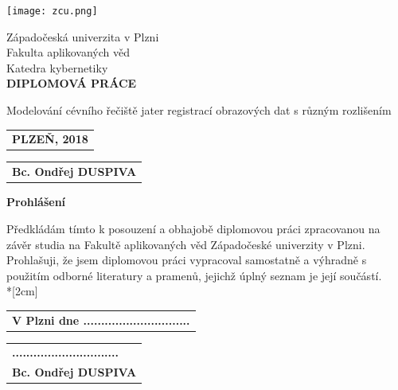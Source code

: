 \documentclass{thesis}%
\begin{document}
%
\sloppy %
\begin{titlepage}
    \begin{center}
        \vspace*{0.6cm}
        

        
        \texttt{[image: zcu.png]}
        
        Západočeská univerzita v Plzni\\
        Fakulta aplikovaných věd\\       
        Katedra kybernetiky\\

        \vspace{4 cm}
     \textbf{DIPLOMOVÁ PRÁCE}
        
        \vspace{0.5cm}
        Modelování cévního řečiště jater registrací obrazových dat s různým rozlišením
        
        \vspace{6cm}
   \end{center}    

\begin{tabular}[t]{@{}l} 
 \textbf{PLZEŇ, 2018}
\end{tabular}
\hfill%
\begin{tabular}[t]{l@{}}
   \textbf{Bc. Ondřej DUSPIVA}
\end{tabular}
        
        \vfill
\end{titlepage}
\thispagestyle{empty}
\textbf{Prohlášení}

\vspace{0.6cm}

Předkládám tímto k posouzení a obhajobě diplomovou práci zpracovanou na závěr
studia na Fakultě aplikovaných věd Západočeské univerzity v Plzni.\\
Prohlašuji, že jsem diplomovou práci vypracoval samostatně a výhradně s použitím
odborné literatury a pramenů, jejichž úplný seznam je její součástí.\\*[2cm]

\begin{tabular}[t]{@{}l} 
 \textbf{V Plzni dne ..............................}
\end{tabular}
\hfill%
\begin{tabular}[t]{l@{}}
    \textbf{..............................}\\
   \textbf{Bc. Ondřej DUSPIVA}
\end{tabular}
\newpage 
\end{document}
